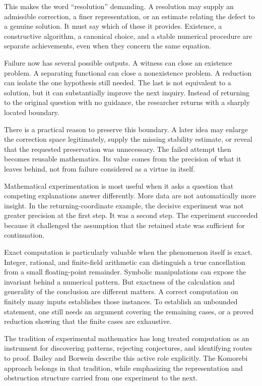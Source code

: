 This makes the word ``resolution'' demanding. A resolution may supply an admissible correction, a finer representation, or an estimate relating the defect to a genuine solution. It must say which of these it provides. Existence, a constructive algorithm, a canonical choice, and a stable numerical procedure are separate achievements, even when they concern the same equation.

Failure now has several possible outputs. A witness can close an existence problem. A separating functional can close a nonexistence problem. A reduction can isolate the one hypothesis still needed. The last is not equivalent to a solution, but it can substantially improve the next inquiry. Instead of returning to the original question with no guidance, the researcher returns with a sharply located boundary.

There is a practical reason to preserve this boundary. A later idea may enlarge the correction space legitimately, supply the missing stability estimate, or reveal that the requested preservation was unnecessary. The failed attempt then becomes reusable mathematics. Its value comes from the precision of what it leaves behind, not from failure considered as a virtue in itself.


Mathematical experimentation is most useful when it asks a question that competing explanations answer differently. More data are not automatically more insight. In the returning-coordinate example, the decisive experiment was not greater precision at the first step. It was a second step. The experiment succeeded because it challenged the assumption that the retained state was sufficient for continuation.

Exact computation is particularly valuable when the phenomenon itself is exact. Integer, rational, and finite-field arithmetic can distinguish a true cancellation from a small floating-point remainder. Symbolic manipulations can expose the invariant behind a numerical pattern. But exactness of the calculation and generality of the conclusion are different matters. A correct computation on finitely many inputs establishes those instances. To establish an unbounded statement, one still needs an argument covering the remaining cases, or a proved reduction showing that the finite cases are exhaustive.

The tradition of experimental mathematics has long treated computation as an instrument for discovering patterns, rejecting conjectures, and identifying routes to proof. Bailey and Borwein describe this active role explicitly. The Komorebi approach belongs in that tradition, while emphasizing the representation and obstruction structure carried from one experiment to the next.

